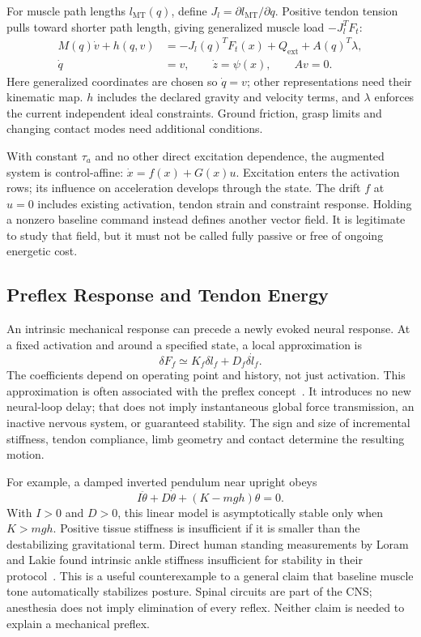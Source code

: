 For muscle path lengths $l_{\mathrm{MT}}(q)$, define
$J_l=\partial l_{\mathrm{MT}}/\partial q$. Positive tendon tension pulls toward
shorter path length, giving generalized muscle load $-J_l^T F_t$:
\begin{align}
M(q)\dot v+h(q,v)&=-J_l(q)^TF_t(x)+Q_{\mathrm{ext}}+A(q)^T\lambda,
\label{eq:ch8:body-dynamics}\\
\dot q&=v,\qquad \dot z=\psi(x),\qquad
Av=0.
\end{align}
Here generalized coordinates are chosen so $\dot q=v$; other representations
need their kinematic map. $h$ includes the declared gravity and velocity terms,
and $\lambda$ enforces the current independent ideal constraints. Ground friction,
grasp limits and changing contact modes need additional conditions.

With constant $\tau_a$ and no other direct excitation dependence, the augmented
system is control-affine: $\dot x=f(x)+G(x)u$. Excitation enters the activation
rows; its influence on acceleration develops through the state. The drift
$f$ at $u=0$ includes existing activation, tendon strain and constraint response.
Holding a nonzero baseline command instead defines another vector field. It is
legitimate to study that field, but it must not be called fully passive or free
of ongoing energetic cost.

\subsection{Preflex Response and Tendon Energy}

An intrinsic mechanical response can precede a newly evoked neural response.
At a fixed activation and around a specified state, a local approximation is
\begin{equation}
\delta F_f\simeq K_f\delta l_f+D_f\delta\dot l_f.
\label{eq:ch8:preflex-force}
\end{equation}
The coefficients depend on operating point and history, not just activation.
This approximation is often associated with the preflex concept~\cite{Loeb1995}.
It introduces no new neural-loop delay; that does not imply instantaneous global
force transmission, an inactive nervous system, or guaranteed stability.
The sign and size of incremental stiffness, tendon compliance, limb geometry
and contact determine the resulting motion.

For example, a damped inverted pendulum near upright obeys
\begin{equation}
I\ddot\theta+D\dot\theta+(K-mgh)\theta=0.
\label{eq:ch8:posture-stability}
\end{equation}
With $I>0$ and $D>0$, this linear model is asymptotically stable only when
$K>mgh$. Positive tissue stiffness is insufficient if it is smaller than the
destabilizing gravitational term. Direct human standing measurements by Loram
and Lakie found intrinsic ankle stiffness insufficient for stability in their
protocol~\cite{LoramLakie2002}. This is a useful counterexample to a general
claim that baseline muscle tone automatically stabilizes posture. Spinal
circuits are part of the CNS; anesthesia does not imply elimination of every
reflex. Neither claim is needed to explain a mechanical preflex.

